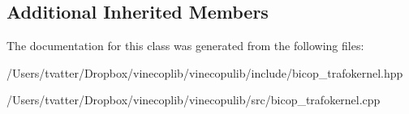 \subsection*{Additional Inherited Members}


The documentation for this class was generated from the following files\+:\begin{DoxyCompactItemize}
\item 
/\+Users/tvatter/\+Dropbox/vinecoplib/vinecopulib/include/bicop\+\_\+trafokernel.\+hpp\item 
/\+Users/tvatter/\+Dropbox/vinecoplib/vinecopulib/src/bicop\+\_\+trafokernel.\+cpp\end{DoxyCompactItemize}
